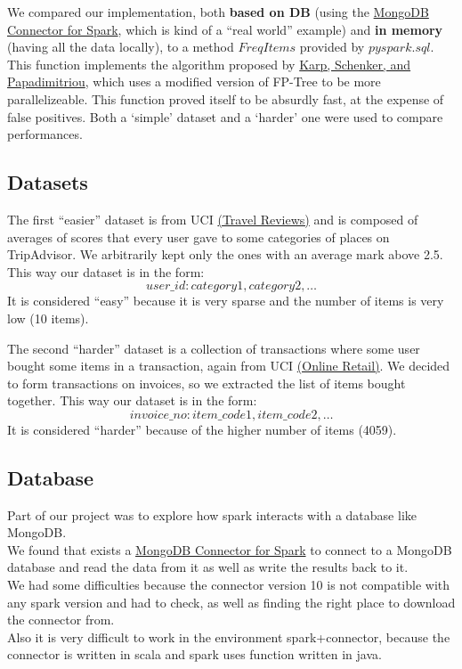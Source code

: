 \documentclass[a4paper]{article}
\begin{document}
	We compared our implementation, both \textbf{based on DB} (using the \href{https://www.mongodb.com/docs/spark-connector/current/}{MongoDB Connector for Spark}, which is kind of a ``real world'' example) and \textbf{in memory} (having all the data locally), to a method $FreqItems$ provided by $pyspark.sql$. 
	This function implements the algorithm proposed by \href{https://doi.org/10.1145/762471.762473}{Karp, Schenker, and Papadimitriou}, which uses a modified version of FP-Tree to be more parallelizeable. This function proved itself to be absurdly fast, at the expense of false positives.
	Both a  `simple' dataset and a `harder' one were used to compare performances.

	\subsection{Datasets}
	The first ``easier'' dataset is from UCI \href{https://archive.ics.uci.edu/ml/datasets/Travel+Reviews#}{(Travel Reviews)} and is composed of averages of scores that every user gave to some
	categories of places on TripAdvisor. We arbitrarily kept only the ones with an average mark above 2.5. This way our dataset is in the form:
	\[ user\_id: category1, category2, \ldots \]
	It is considered ``easy'' because it is very sparse and the number of items is very low (10 items).

	The second ``harder'' dataset is a collection of transactions where some user bought some items in a transaction, again from UCI \href{https://archive.ics.uci.edu/ml/datasets/online+retail}{(Online Retail)}.
	We decided to form transactions on invoices, so we extracted the list of items bought together.
	This way our dataset is in the form:
	\[ invoice\_no: item\_code1, item\_code2, \ldots \]
	It is considered ``harder'' because of the higher number of items (4059).

	\subsection{Database}
	Part of our project was to explore how spark interacts with a database like MongoDB.\\
	We found that exists a \href{https://www.mongodb.com/docs/spark-connector/current/}{MongoDB Connector for Spark} to connect to a MongoDB database and read the data from it as well as 
	write the results back to it.\\
	We had some difficulties because the connector version 10 is not compatible with any spark version and had to check, as well as finding the right place to download the connector from.\\
	Also it is very difficult to work in the environment spark+connector, because the connector is written in scala and spark uses function written in java.\\
	
\end{document}
